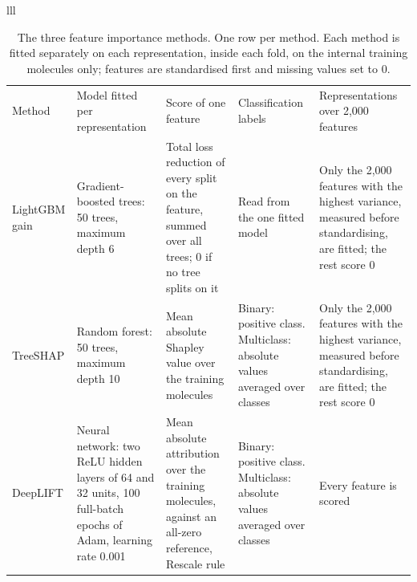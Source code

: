 \begin{table}[t]
\begin{tabular}{lll}
\caption{The three feature importance methods. One row per method. Each method is fitted separately on each representation, inside each fold, on the internal training molecules only; features are standardised first and missing values set to 0.}
\label{tab:importance_methods}
\begin{tabular}{p{1.9cm}p{3.0cm}p{3.0cm}p{2.5cm}p{2.5cm}}
Method & Model fitted per representation & Score of one feature & Classification labels & Representations over 2,000 features \\
LightGBM gain \citep{ke2017lightgbm} & Gradient-boosted trees: 50 trees, maximum depth 6 & Total loss reduction of every split on the feature, summed over all trees; 0 if no tree splits on it & Read from the one fitted model & Only the 2,000 features with the highest variance, measured before standardising, are fitted; the rest score 0 \\
TreeSHAP \citep{Breiman2001, Lundberg2020} & Random forest: 50 trees, maximum depth 10 & Mean absolute Shapley value over the training molecules & Binary: positive class. Multiclass: absolute values averaged over classes & Only the 2,000 features with the highest variance, measured before standardising, are fitted; the rest score 0 \\
DeepLIFT \citep{Shrikumar2017, Kokhlikyan2020} & Neural network: two ReLU hidden layers of 64 and 32 units, 100 full-batch epochs of Adam, learning rate 0.001 \citep{Kingma2015} & Mean absolute attribution over the training molecules, against an all-zero reference, Rescale rule & Binary: positive class. Multiclass: absolute values averaged over classes & Every feature is scored \\

\end{tabular}
\end{tabular}
\end{table}
